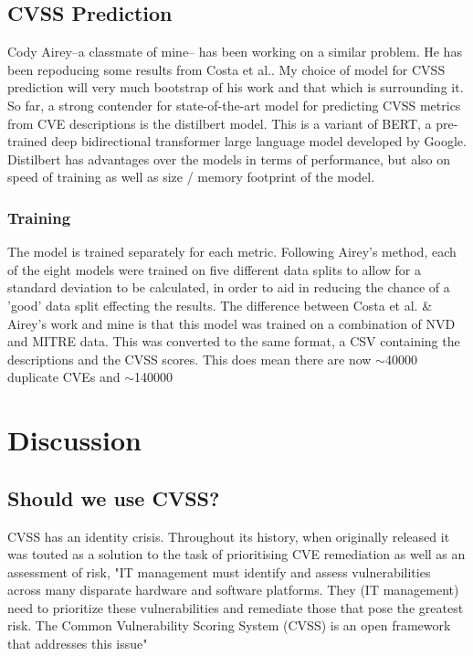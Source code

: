 \documentclass[12pt]{article}
\begin{document}
\subsection{CVSS Prediction}

Cody Airey--a classmate of mine-- has been working on a similar problem. He has been repoducing some
results from Costa et al.\cite{costa}. My choice of model for CVSS prediction will very much
bootstrap of his work and that which is surrounding it. So far, a strong contender for
state-of-the-art model for predicting CVSS metrics from CVE descriptions is the distilbert
model\cite{distilbert}. This is a variant of BERT\cite{BERT}, a pre-trained deep bidirectional
transformer large language model developed by Google. Distilbert has advantages over the models in
terms of performance, but also on speed of training as well as size / memory footprint of the
model.

\subsubsection{Training}

The model is trained separately for each metric. Following Airey's method, each of the eight models
were trained on five different data splits to allow for a standard deviation to be calculated, in
order to aid in reducing the chance of a 'good' data split effecting the results. The difference
between Costa et al. \& Airey's work and mine is that this model was trained on a combination of NVD and MITRE
data. This was converted to the same format, a CSV containing the descriptions and the CVSS scores.
This does mean there are now $\sim$40000 duplicate CVEs and $\sim$140000
\section{Discussion}

\subsection{Should we use CVSS?}

CVSS has an identity crisis. Throughout its history, when originally released it was touted as a
solution to the task of prioritising CVE remediation as well as an assessment of risk, "IT
management must identify and assess vulnerabilities across many disparate hardware and software
platforms. They (IT management) need to prioritize these vulnerabilities and remediate those that
pose the greatest risk. The Common Vulnerability Scoring System (CVSS) is an open framework that
addresses this issue"
\end{document}
